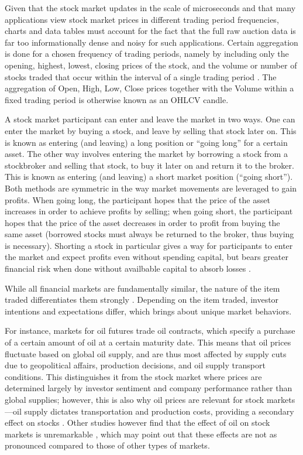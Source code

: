 \documentclass[stu,floatsintext]{apa7}
\begin{document}
Given that the stock market updates in the scale of microseconds \parencite{zaznov2024intraday} and that many applications view stock market prices in different trading period frequencies, charts and data tables must account for the fact that the full raw auction data is far too informationally dense and noisy for such applications. Certain aggregation is done for a chosen frequency of trading periods, namely by including only the opening, highest, lowest, closing prices of the stock, and the volume or number of stocks traded that occur within the interval of a single trading period \parencite{schabacker2021technical}. The aggregation of Open, High, Low, Close prices together with the Volume within a fixed trading period is otherwise known as an OHLCV candle.

A stock market participant can enter and leave the market in two ways. One can enter the market by buying a stock, and leave by selling that stock later on. This is known as entering (and leaving) a long position or ``going long'' for a certain asset. The other way involves entering the market by borrowing a stock from a stockbroker and selling that stock, to buy it later on and return it to the broker. This is known as entering (and leaving) a short market position (``going short''). Both methods are symmetric in the way market movements are leveraged to gain profits. When going long, the participant hopes that the price of the asset increases in order to achieve profits by selling; when going short, the participant hopes that the price of the asset decreases in order to profit from buying the same asset (borrowed stocks must always be returned to the broker, thus buying is necessary). Shorting a stock in particular gives a way for participants to enter the market and expect profits even without spending capital, but bears greater financial risk when done without availbable capital to absorb losses \parencite{reed2013shortselling}.

While all financial markets are fundamentally similar, the nature of the item traded differentiates them strongly \parencite{mishkin2018economics}. Depending on the item traded, investor intentions and expectations differ, which brings about unique market behaviors.

For instance, markets for oil futures trade oil contracts, which specify a purchase of a certain amount of oil at a certain maturity date. This means that oil prices fluctuate based on global oil supply, and are thus most affected by supply cuts due to geopolitical affairs, production decisions, and oil supply transport conditions. This distinguishes it from the stock market where prices are determined largely by investor sentiment and company performance rather than global supplies; however, this is also why oil prices are relevant for stock markets—oil supply dictates transportation and production costs, providing a secondary effect on stocks \parencite{park2008oil}. Other studies however find that the effect of oil on stock markets is unremarkable \parencite{apergis2009oil}, which may point out that these effects are not as pronounced compared to those of other types of markets.
\end{document}
